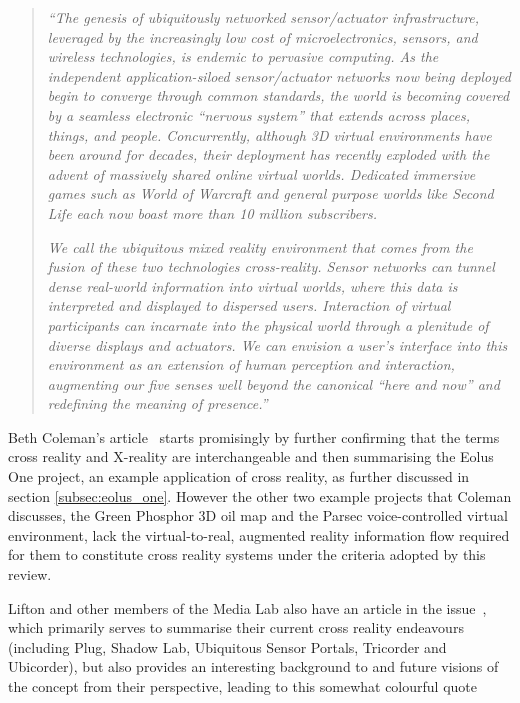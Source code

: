 \begin{quote}
\textit{``The genesis of ubiquitously networked sensor/actuator infrastructure, leveraged by the increasingly low cost of microelectronics, sensors, and wireless technologies, is endemic to pervasive computing. As the independent application-siloed sensor/actuator networks now being deployed begin to converge through common standards, the world is becoming covered by a seamless electronic ``nervous system'' that extends across places, things, and people. Concurrently, although 3D virtual environments have been around for decades, their deployment has recently exploded with the advent of massively shared online virtual worlds. Dedicated immersive games such as World of Warcraft and general purpose worlds like Second Life each now boast more than 10 million subscribers.}

\textit{We call the ubiquitous mixed reality environment that comes from the fusion of these two technologies cross-reality. Sensor networks can tunnel dense real-world information into virtual worlds, where this data is interpreted and displayed to dispersed users. Interaction of virtual participants can incarnate into the physical world through a plenitude of diverse displays and actuators. We can envision a user's interface into this environment as an extension of human perception and interaction, augmenting our five senses well beyond the canonical ``here and now'' and redefining the meaning of presence.''}
\end{quote}

Beth Coleman's article~\cite{Coleman2009} starts promisingly by further confirming that the terms cross reality and X-reality are interchangeable and then summarising the Eolus One project, an example application of cross reality, as further discussed in section \ref{subsec:eolus_one}. However the other two example projects that Coleman discusses, the Green Phosphor 3D oil map and the Parsec voice-controlled virtual environment, lack the virtual-to-real, augmented reality information flow required for them to constitute cross reality systems under the criteria adopted by this review.

Lifton and other members of the Media Lab also have an article in the issue~\cite{Lifton2009}, which primarily serves to summarise their current cross reality endeavours (including Plug, Shadow Lab, Ubiquitous Sensor Portals, Tricorder and Ubicorder), but also provides an interesting background to and future visions of the concept from their perspective, leading to this somewhat colourful quote

